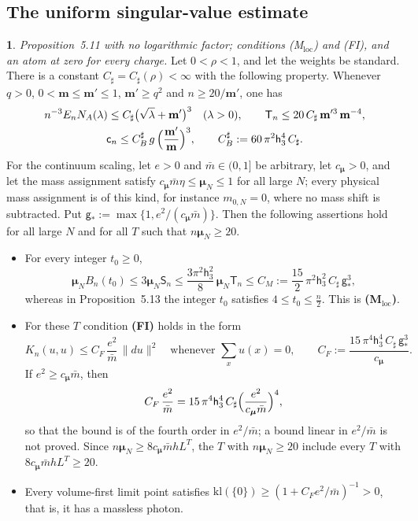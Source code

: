 \documentclass[11pt]{amsart}
\newcommand{\namedhead}{}
\theoremstyle{definition}
\newtheorem*{namedinner}{\namedhead}
\newenvironment{named}[1]{\renewcommand{\namedhead}{#1}\begin{namedinner}}{\end{namedinner}}
\begin{document}
\subsection{The uniform singular-value estimate}
\begin{named}{Theorem 5.14}
\emph{Proposition~5.11 with no logarithmic factor; conditions (M$_{\mathrm{loc}}$) and (FI), and an atom at zero for every charge.}
Let $0<\rho<1$, and let the weights be standard.
There is a constant $C_\sharp=C_\sharp(\rho)<\infty$ with the following property.
Whenever $q>0$, $0<\mathbf m\le\mathbf m'\le1$, $\mathbf m'\ge q^2$ and $n\ge20/\mathbf m'$, one has
\begin{gather*}
n^{-3}E_nN_A(\lambda)\le C_\sharp\bigl(\sqrt\lambda+\mathbf m'\bigr)^3\quad(\lambda>0),\qquad\mathsf T_n\le20\,C_\sharp\,\mathbf m'^3\,\mathbf m^{-4},\\
\mathsf c_n\le C_B^\sharp\,g\,\Bigl(\frac{\mathbf m'}{\mathbf m}\Bigr)^3,\qquad C_B^\sharp:=60\,\pi^2\mathsf h_3^4\,C_\sharp.
\end{gather*}
For the continuum scaling, let $e>0$ and $\bar m\in(0,1]$ be arbitrary, let $c_{\boldsymbol\mu}>0$, and let the mass assignment satisfy $c_{\boldsymbol\mu}\bar m\eta\le\boldsymbol\mu_N\le1$ for all large $N$;
every physical mass assignment is of this kind, for instance $m_{0,N}=0$, where no mass shift is subtracted.
Put $\mathsf g_*:=\max\{1,e^2/(c_{\boldsymbol\mu}\bar m)\}$.
Then the following assertions hold for all large $N$ and for all $T$ such that $n\boldsymbol\mu_N\ge20$.
\begin{itemize}
\item[(a)] For every integer $t_0\ge0$,
\begin{equation*}
\boldsymbol\mu_NB_n(t_0)\le3\boldsymbol\mu_N\mathsf S_n\le\frac{3\pi^2\mathsf h_3^2}{8}\,\boldsymbol\mu_N\mathsf T_n\le C_M:=\frac{15}{2}\,\pi^2\mathsf h_3^2\,C_\sharp\,\mathsf g_*^3,
\end{equation*}
whereas in Proposition~5.13 the integer $t_0$ satisfies $4\le t_0\le\frac n2$.
This is \textbf{(M$_{\mathrm{loc}}$)}.
\item[(b)] For these $T$ condition \textbf{(FI)} holds in the form
\begin{equation*}
K_n(u,u)\le C_F\,\frac{e^2}{\bar m}\,\|du\|^2\quad\text{whenever }\sum_xu(x)=0,\qquad C_F:=\frac{15\,\pi^4\mathsf h_3^4\,C_\sharp\,\mathsf g_*^3}{c_{\boldsymbol\mu}}.
\end{equation*}
If $e^2\ge c_{\boldsymbol\mu}\bar m$, then
\begin{equation*}
C_F\,\frac{e^2}{\bar m}=15\,\pi^4\mathsf h_3^4\,C_\sharp\Bigl(\frac{e^2}{c_{\boldsymbol\mu}\bar m}\Bigr)^4,
\end{equation*}
so that the bound is of the fourth order in $e^2/\bar m$;
a bound linear in $e^2/\bar m$ is not proved.
Since $n\boldsymbol\mu_N\ge8c_{\boldsymbol\mu}\bar mhL^T$, the $T$ with $n\boldsymbol\mu_N\ge20$ include every $T$ with $8c_{\boldsymbol\mu}\bar mhL^T\ge20$.

\item[(c)] Every volume-first limit point satisfies $\mathrm{kl}(\{0\})\ge(1+C_Fe^2/\bar m)^{-1}>0$, that is, it has a massless photon.
\end{itemize}
\end{named}
\end{document}
